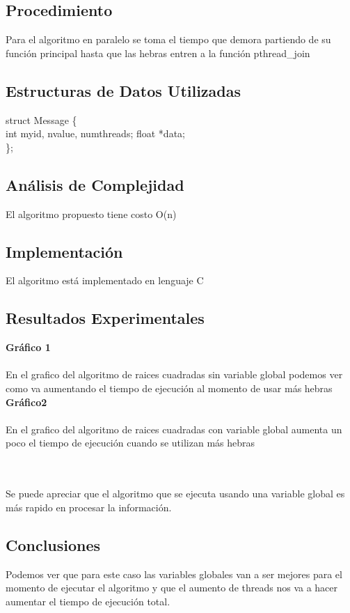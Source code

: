 \documentclass{report}
\newcommand \minitab{\hspace*{15 pt}}
\begin{document}
%
\subsection{Procedimiento}
Para el algoritmo en paralelo se toma el tiempo que demora partiendo de su función principal hasta que las hebras entren a la función pthread_join 


%
\subsection{Estructuras de Datos Utilizadas}
struct Message \{\\
   \minitab int myid, nvalue, numthreads;
   float *data;\\
\};   


\subsection{An\'alisis de Complejidad}
El algoritmo propuesto tiene costo O(n)
%
\subsection{Implementaci\'on}
El algoritmo est\'a implementado en lenguaje C
\newpage

\subsection{Resultados Experimentales}
\textbf{Gráfico 1} \\
\\En el grafico del algoritmo de raices cuadradas sin variable global podemos ver como va aumentando el tiempo de ejecución al momento de usar más hebras \\


\textbf{Gráfico2}\\
\\
En el grafico del algoritmo de raices cuadradas con variable global aumenta un poco el tiempo de ejecución cuando se utilizan más hebras

\\\\
Se puede apreciar que el algoritmo que se ejecuta usando una variable global es más rapido en procesar la información.

\subsection{Conclusiones}
Podemos ver que para este caso las variables globales van a ser mejores para el momento de ejecutar el algoritmo y que el aumento de threads nos va a hacer aumentar el tiempo de ejecución total.
\end{document}
